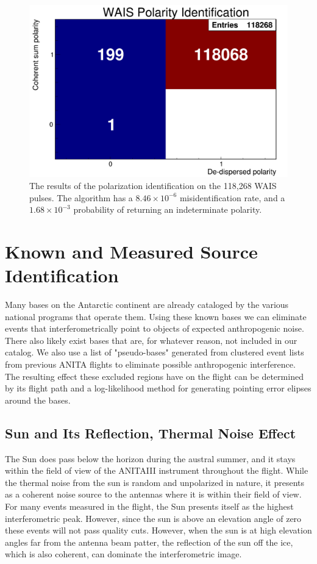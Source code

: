 		
\begin{figure}
	\centering
	\includegraphics[width=\textwidth]{figures/waisPolarity}
	\caption{The results of the polarization identification on the 118,268 WAIS pulses.  The algorithm has a $8.46\times10^{-6}$ misidentification rate, and a $1.68\times10^{-3}$ probability of returning an indeterminate polarity.} 
	\label{fig:waisPolarity}
\end{figure}
	

		
\section{Known and Measured Source Identification}%
	Many bases on the Antarctic continent are already cataloged by the various national programs that operate them.  Using these known bases we can eliminate events that interferometrically point to objects of expected anthropogenic noise.  There also likely exist bases that are, for whatever reason, not included in our catalog.  We also use a list of "pseudo-bases" generated from clustered event lists from previous ANITA flights to eliminate possible anthropogenic interference.  The resulting effect these excluded regions have on the flight can be determined by its flight path and a log-likelihood method for generating pointing error elipses around the bases.
	
	
	\subsection{Sun and Its Reflection, Thermal Noise Effect}
		The Sun does pass below the horizon during the austral summer, and it stays within the field of view of the ANITAIII instrument throughout the flight.  While the thermal noise from the sun is random and unpolarized in nature, it presents as a coherent noise source to the antennas where it is within their field of view.  For many events measured in the flight, the Sun presents itself as the highest interferometric peak.  However, since the sun is above an elevation angle of zero these events will not pass quality cuts. However, when the sun is at high elevation angles far from the antenna beam patter, the reflection of the sun off the ice, which is also coherent, can dominate the interferometric image.
	
